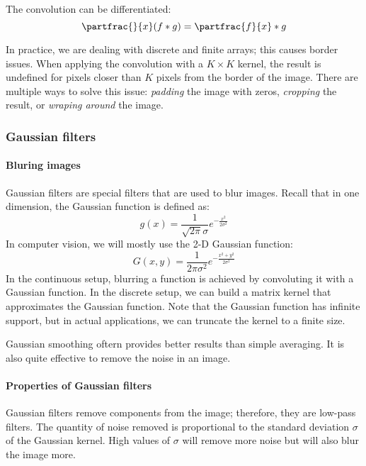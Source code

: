 The convolution can be differentiated:
\begin{equation}
    \label{eq:diff-conv}
    \partfrac{}{x}(f*g) = \partfrac{f}{x}*g
\end{equation}

In practice, we are dealing with discrete and finite arrays; this causes border issues. When applying the convolution with a $K\times K$ kernel, the result is undefined for pixels closer than $K$ pixels from the border of the image. There are multiple ways to solve this issue: \emph{padding} the image with zeros, \emph{cropping} the result, or \emph{wraping around} the image.

\subsubsection{Gaussian filters}
\paragraph*{Bluring images}
Gaussian filters are special filters that are used to blur images. Recall that in one dimension, the Gaussian function is defined as:
\begin{equation*}
    g(x) = \frac{1}{\sqrt{2\pi}\sigma}e^{-\frac{x^2}{2\sigma^2}}
\end{equation*}
In computer vision, we will mostly use the 2-D Gaussian function:
\begin{equation*}
    G(x, y) = \frac{1}{2\pi\sigma^2}e^{-\frac{x^2+y^2}{2\sigma^2}}
\end{equation*}
In the continuous setup, blurring a function is achieved by convoluting it with a Gaussian function. In the discrete setup, we can build a matrix kernel that approximates the Gaussian function. Note that the Gaussian function has infinite support, but in actual applications, we can truncate the kernel to a finite size.

Gaussian smoothing oftern provides better results than simple averaging. It is also quite effective to remove the noise in an image. 

\paragraph*{Properties of Gaussian filters}
Gaussian filters remove  components from the image; therefore, they are low-pass filters. The quantity of noise removed is proportional to the standard deviation $\sigma$ of the Gaussian kernel. High values of $\sigma$ will remove more noise but will also blur the image more.

